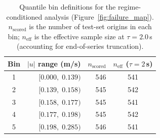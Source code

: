 \begin{table}[htbp]
  \centering
  \caption{Quantile bin definitions for the regime-conditioned
           analysis (Figure~\ref{fig:failure_map}).  $n_{\mathrm{scored}}$
           is the number of test-set origins in each bin;
           $n_{\mathrm{eff}}$ is the effective sample size at
           $\tau = 2.0$\,\si{s} (accounting for end-of-series
           truncation).}
  \label{tab:failure_bins}
  \begin{tabular}{crrc}
    \toprule
    Bin & $|u|$ range (m/s) & $n_{\mathrm{scored}}$ & $n_{\mathrm{eff}}$ ($\tau{=}2$\,s) \\
    \midrule
    1 & $[0.000,\; 0.139)$ & 546 & 541 \\
    2 & $[0.139,\; 0.158)$ & 545 & 542 \\
    3 & $[0.158,\; 0.177)$ & 545 & 541 \\
    4 & $[0.177,\; 0.198)$ & 545 & 542 \\
    5 & $[0.198,\; 0.285)$ & 546 & 541 \\
    \bottomrule
  \end{tabular}
\end{table}
